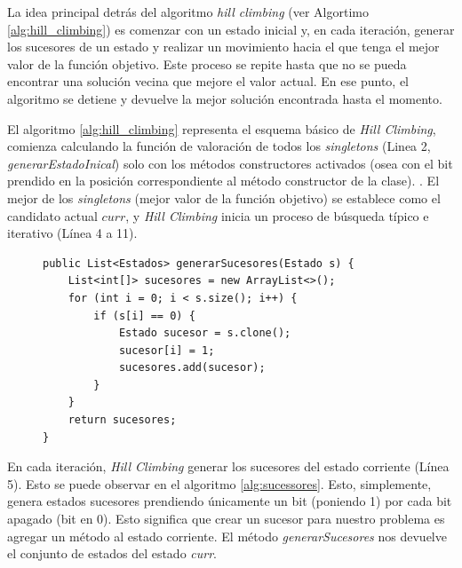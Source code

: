 La idea principal detrás del algoritmo \emph{hill climbing} (ver Algortimo \ref{alg:hill_climbing}) es comenzar con un estado inicial y, en cada iteración, generar los sucesores de un estado y realizar un movimiento hacia el que tenga el mejor valor de la función objetivo. Este proceso se repite hasta que no se pueda encontrar una solución vecina que mejore el valor actual. En ese punto, el algoritmo se detiene y devuelve la mejor solución encontrada hasta el momento. 


El algoritmo \ref{alg:hill_climbing} representa el esquema básico de \emph{Hill Climbing}, comienza
calculando la función de valoración de todos los \emph{singletons} (Linea 2, \emph{generarEstadoInical}) solo con los métodos constructores activados (osea con el bit prendido en la posición correspondiente al método constructor de la clase). . El mejor de los \emph{singletons} (mejor valor de la función objetivo) se establece como el candidato actual $curr$, y \emph{Hill Climbing} inicia un proceso de búsqueda típico e iterativo (Línea 4 a 11). 

\begin{figure}[H]
\begin{lstlisting}[style=javaStyle, caption={Algoritmo de Hill Climbing}, label={alg:sucessores}]
public List<Estados> generarSucesores(Estado s) {
    List<int[]> sucesores = new ArrayList<>();  
    for (int i = 0; i < s.size(); i++) {
        if (s[i] == 0) {
            Estado sucesor = s.clone();
            sucesor[i] = 1;
            sucesores.add(sucesor);
        }
    }
    return sucesores;
}
\end{lstlisting}
\end{figure}
En cada iteración, \emph{Hill Climbing} generar los sucesores del estado corriente (Línea 5). Esto se puede observar en el algoritmo \ref{alg:sucessores}. Esto, simplemente, genera estados sucesores prendiendo únicamente un bit (poniendo 1) por cada bit apagado (bit en 0). Esto significa que crear un sucesor para nuestro problema es agregar un método al estado corriente. El método \emph{generarSucesores} nos devuelve el conjunto de estados del estado \emph{curr}. 

